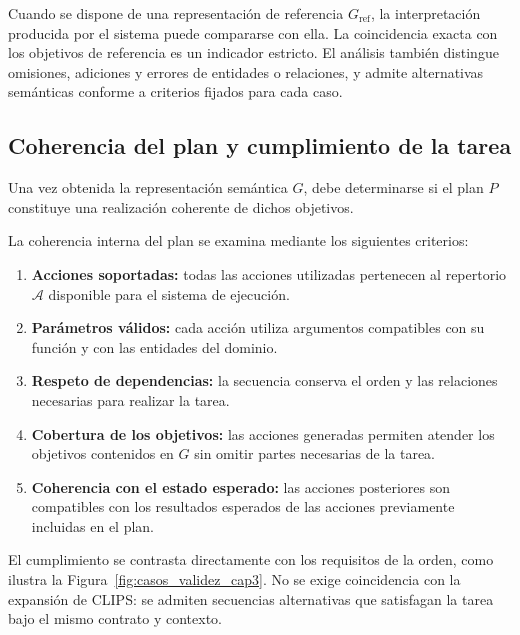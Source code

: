 Cuando se dispone de una representación de referencia $G_{\mathrm{ref}}$, 
la interpretación producida por el sistema puede compararse con ella. 
La coincidencia exacta con los objetivos de referencia es un indicador estricto. El análisis también distingue omisiones, adiciones y errores de entidades o relaciones, y admite alternativas semánticas conforme a criterios fijados para cada caso.

\subsection{Coherencia del plan y cumplimiento de la tarea}
\label{subsec:validez_plan}

Una vez obtenida la representación semántica $G$, debe determinarse si el plan
$P$ constituye una realización coherente de dichos objetivos.

La coherencia interna del plan se examina mediante los siguientes criterios:

\begin{enumerate}

    \item \textbf{Acciones soportadas:} todas las acciones utilizadas pertenecen
    al repertorio $\mathcal{A}$ disponible para el sistema de ejecución.

    \item \textbf{Parámetros válidos:} cada acción utiliza argumentos compatibles
    con su función y con las entidades del dominio.

    \item \textbf{Respeto de dependencias:} la secuencia conserva el orden y las
    relaciones necesarias para realizar la tarea.

    \item \textbf{Cobertura de los objetivos:} las acciones generadas permiten
    atender los objetivos contenidos en $G$ sin omitir partes necesarias de la
    tarea.

    \item \textbf{Coherencia con el estado esperado:} las acciones posteriores
    son compatibles con los resultados esperados de las acciones previamente
    incluidas en el plan.

\end{enumerate}

El cumplimiento se contrasta directamente con los requisitos de la orden, como ilustra la Figura~\ref{fig:casos_validez_cap3}. No se exige coincidencia con la expansión de CLIPS: se admiten secuencias alternativas que satisfagan la tarea bajo el mismo contrato y contexto.

